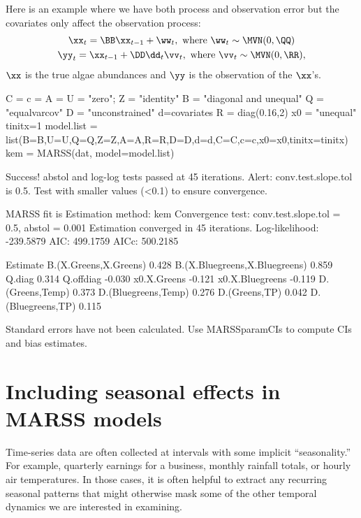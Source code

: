 Here is an example where we have both process and observation error but the covariates only affect the observation process:
\begin{equation}
\begin{gathered}
\xx_t = \BB\xx_{t-1}  + \ww_t, \text{ where } \ww_t \sim \MVN(0,\QQ)\\ 
\yy_t = \xx_{t-1} + \DD\dd_t  \vv_t, \text{ where } \vv_t \sim \MVN(0,\RR), 
\end{gathered}
\end{equation}
$\xx$ is the true algae abundances and $\yy$ is the observation of the $\xx$'s.

\begin{Schunk}
\begin{Sinput}
 C = c = A = U = "zero"; Z = "identity"
 B = "diagonal and unequal"
 Q = "equalvarcov"
 D = "unconstrained"
 d=covariates
 R = diag(0.16,2)
 x0 = "unequal"
 tinitx=1
 model.list = list(B=B,U=U,Q=Q,Z=Z,A=A,R=R,D=D,d=d,C=C,c=c,x0=x0,tinitx=tinitx)
 kem = MARSS(dat, model=model.list)
\end{Sinput}
\begin{Soutput}
Success! abstol and log-log tests passed at 45 iterations.
Alert: conv.test.slope.tol is 0.5.
Test with smaller values (<0.1) to ensure convergence.

MARSS fit is
Estimation method: kem 
Convergence test: conv.test.slope.tol = 0.5, abstol = 0.001
Estimation converged in 45 iterations. 
Log-likelihood: -239.5879 
AIC: 499.1759   AICc: 500.2185   
 
                              Estimate
B.(X.Greens,X.Greens)            0.428
B.(X.Bluegreens,X.Bluegreens)    0.859
Q.diag                           0.314
Q.offdiag                       -0.030
x0.X.Greens                     -0.121
x0.X.Bluegreens                 -0.119
D.(Greens,Temp)                  0.373
D.(Bluegreens,Temp)              0.276
D.(Greens,TP)                    0.042
D.(Bluegreens,TP)                0.115

Standard errors have not been calculated. 
Use MARSSparamCIs to compute CIs and bias estimates.
\end{Soutput}
\end{Schunk}

\section{Including seasonal effects in MARSS models}
\label{chap:covariates:season}
Time-series data are often collected at intervals with some implicit ``seasonality.'' For example, quarterly earnings for a business, monthly rainfall totals, or hourly air temperatures. In those cases, it is often helpful to extract any recurring seasonal patterns that might otherwise mask some of the other temporal dynamics we are interested in examining.

